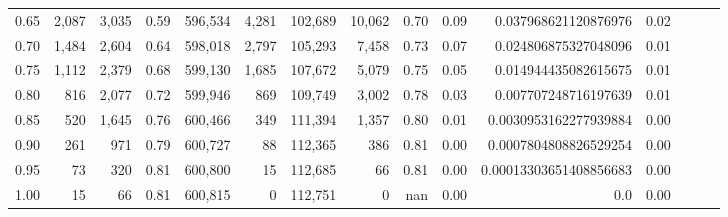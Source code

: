 \begin{tabular}{rrrrrrrrrrrrrrr}
0.65 &    2,087 &   3,035 &  0.59 &  596,534 &    4,281 &  102,689 &   10,062 &  0.70 &  0.09 &    0.037968621120876976 &      0.02 \\
0.70 &    1,484 &   2,604 &  0.64 &  598,018 &    2,797 &  105,293 &    7,458 &  0.73 &  0.07 &    0.024806875327048096 &      0.01 \\
0.75 &    1,112 &   2,379 &  0.68 &  599,130 &    1,685 &  107,672 &    5,079 &  0.75 &  0.05 &    0.014944435082615675 &      0.01 \\
0.80 &      816 &   2,077 &  0.72 &  599,946 &      869 &  109,749 &    3,002 &  0.78 &  0.03 &    0.007707248716197639 &      0.01 \\
0.85 &      520 &   1,645 &  0.76 &  600,466 &      349 &  111,394 &    1,357 &  0.80 &  0.01 &   0.0030953162277939884 &      0.00 \\
0.90 &      261 &     971 &  0.79 &  600,727 &       88 &  112,365 &      386 &  0.81 &  0.00 &   0.0007804808826529254 &      0.00 \\
0.95 &       73 &     320 &  0.81 &  600,800 &       15 &  112,685 &       66 &  0.81 &  0.00 &  0.00013303651408856683 &      0.00 \\
1.00 &       15 &      66 &  0.81 &  600,815 &        0 &  112,751 &        0 &   nan &  0.00 &                     0.0 &      0.00 \\
\bottomrule
\end{tabular}
